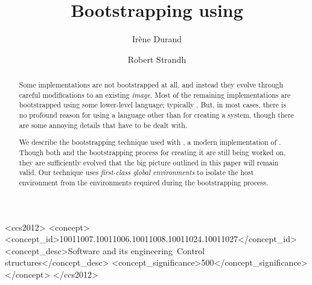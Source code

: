 \documentclass[format=sigconf]{acmart}
\def\inputtex#1{}
\begin{document}
\title{Bootstrapping \commonlisp{} using \commonlisp{}}

\author{Irène Durand
}

\author{Robert Strandh}


\maketitle

\begin{abstract}
Some \commonlisp{} implementations are not bootstrapped at all, and
instead they evolve through careful modifications to an existing
\emph{image}.  Most of the remaining implementations are bootstrapped
using some lower-level language; typically \clanguage{}.  But, in most
cases, there is no profound reason for using a language other than
\commonlisp{} for creating a \commonlisp{} system, though there are
some annoying details that have to be dealt with.

We describe the bootstrapping technique used with \sicl{}, a modern
implementation of \commonlisp{}.  Though both \sicl{} and the
bootstrapping process for creating it are still being worked on, they
are sufficiently evolved that the big picture outlined in this paper
will remain valid.  Our technique uses \emph{first-class global
  environments} to isolate the host environment from the environments
required during the bootstrapping process.
\end{abstract}

\begin{CCSXML}
  <ccs2012>
  <concept>
  <concept_id>10011007.10011006.10011008.10011024.10011027</concept_id>
  <concept_desc>Software and its engineering~Control structures</concept_desc>
  <concept_significance>500</concept_significance>
  </concept>
  </ccs2012>
\end{CCSXML}



\inputtex{sec-introduction.tex}
\inputtex{sec-previous.tex}
\inputtex{sec-sicl.tex}
\inputtex{sec-our-method.tex}
\inputtex{sec-benefits.tex}
\inputtex{sec-conclusions.tex}
\inputtex{sec-acknowledgments.tex}



\end{document}
